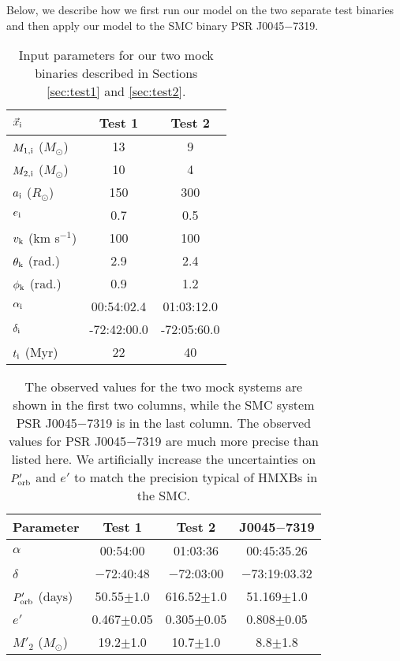 \documentclass[usenatbib]{mnras}
\newcommand{\Msun}{\ifmmode {M_{\odot}}\else${M_{\odot}}$\fi}
\begin{document}
Below, we describe how we first run our model on the two separate test binaries and then apply our model to the SMC binary PSR J0045$-$7319.


\begin{table}
\begin{center}
\caption{Input parameters for our two mock binaries described in Sections \ref{sec:test1} and \ref{sec:test2}.}
\label{tab:mock_data}
\begin{tabular}{lcc} 
\toprule
$\vec{x}_{\rm i}$ & Test 1 & Test 2 \\
\midrule
$M_{\rm 1,i}$ ($M_{\odot}$) & 13 & 9 \\
$M_{\rm 2,i}$ ($M_{\odot}$) & 10 & 4 \\
$a_{\rm i}$ ($R_{\odot}$) & 150 & 300 \\
$e_{\rm i}$ & 0.7 & 0.5 \\
$v_{\rm k}$ (km s$^{-1}$) & 100 & 100 \\
$\theta_{\rm k}$ (rad.) & 2.9 & 2.4 \\
$\phi_{\rm k}$ (rad.) & 0.9 & 1.2 \\
$\alpha_{\rm i}$ & 00:54:02.4 & 01:03:12.0 \\
$\delta_{\rm i}$ & -72:42:00.0 & -72:05:60.0 \\
$t_{\rm i}$ (Myr) & 22 & 40 \\
\bottomrule
\end{tabular}
\end{center}
\end{table}

\begin{table}
\begin{center}
\caption{The observed values for the two mock systems are shown in the first two columns, while the SMC system PSR J0045$-$7319 is in the last column. The observed values for PSR J0045$-$7319 are much more precise than listed here. We artificially increase the uncertainties on $P'_{\rm orb}$ and $e'$ to match the precision typical of HMXBs in the SMC.}
\label{tab:observations}
\begin{tabular}{lccc} 
\toprule
Parameter & Test 1 & Test 2 & J0045$-$7319 \\
\midrule
$\alpha$ & 00:54:00 & 01:03:36 & 00:45:35.26 \\
$\delta$ & $-$72:40:48 & $-$72:03:00 & $-$73:19:03.32 \\
$P'_{\rm orb}$ (days) & 50.55$\pm$1.0 & 616.52$\pm$1.0 & 51.169$\pm$1.0 \\
$e'$ & 0.467$\pm$0.05 & 0.305$\pm$0.05 & 0.808$\pm$0.05 \\
$M'_2$ (\Msun) & 19.2$\pm$1.0 & 10.7$\pm$1.0 & 8.8$\pm$1.8 \\
\bottomrule
\end{tabular}
\end{center}
\end{table}
\end{document}
